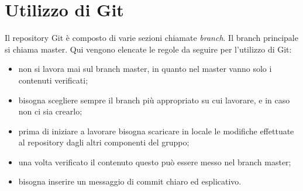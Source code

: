 \section{Utilizzo di Git}
Il repository Git è composto di varie sezioni chiamate \textit{branch}. Il branch principale si chiama master.
Qui vengono elencate le regole da seguire per l'utilizzo di Git:
\begin{itemize}
	\item non si lavora mai sul branch master, in quanto nel master vanno solo i contenuti verificati;
	\item bisogna scegliere sempre il branch più appropriato su cui lavorare, e in caso non ci sia crearlo;
	\item prima di iniziare a lavorare bisogna scaricare in locale le modifiche effettuate al repository dagli altri componenti del gruppo;
	\item una volta verificato il contenuto questo può essere messo nel branch master;
	\item bisogna inserire un messaggio di commit chiaro ed esplicativo.
\end{itemize}